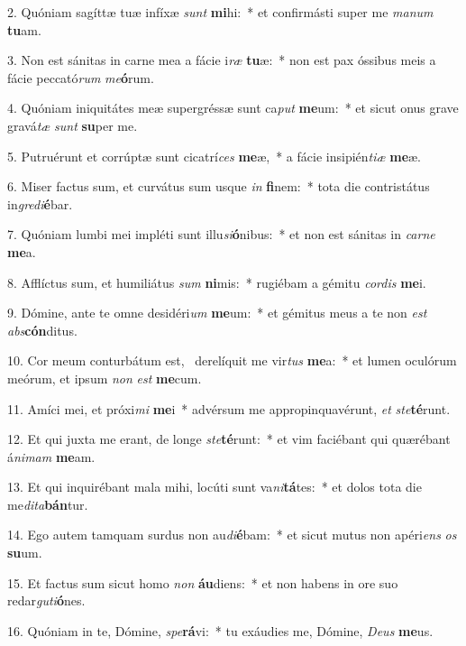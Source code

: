 2. Quóniam sagíttæ tuæ infíxæ \textit{sunt} \textbf{mi}hi:~*  et confirmásti super me \textit{ma}\textit{num} \textbf{tu}am.\

3. Non est sánitas in carne mea a fácie i\textit{ræ} \textbf{tu}æ:~*  non est pax óssibus meis a fácie peccató\textit{rum} \textit{me}\textbf{ó}rum.\

4. Quóniam iniquitátes meæ supergréssæ sunt ca\textit{put} \textbf{me}um:~*  et sicut onus grave gravá\textit{tæ} \textit{sunt} \textbf{su}per me.\

5. Putruérunt et corrúptæ sunt cicatrí\textit{ces} \textbf{me}æ,~*  a fácie insipién\textit{ti}\textit{æ} \textbf{me}æ.\

6. Miser factus sum, et curvátus sum usque \textit{in} \textbf{fi}nem:~*  tota die contristátus in\textit{gre}\textit{di}\textbf{é}bar.\

7. Quóniam lumbi mei impléti sunt illu\textit{si}\textbf{ó}nibus:~*  et non est sánitas in \textit{car}\textit{ne} \textbf{me}a.\

8. Afflíctus sum, et humiliátus \textit{sum} \textbf{ni}mis:~*  rugiébam a gémitu \textit{cor}\textit{dis} \textbf{me}i.\

9. Dómine, ante te omne desidéri\textit{um} \textbf{me}um:~*  et gémitus meus a te non \textit{est} \textit{abs}\textbf{cón}ditus.\

10. Cor meum conturbátum est, \dag\  derelíquit me vir\textit{tus} \textbf{me}a:~*  et lumen oculórum meórum, et ipsum \textit{non} \textit{est} \textbf{me}cum.\

11. Amíci mei, et próxi\textit{mi} \textbf{me}i~*  advérsum me appropinquavérunt, \textit{et} \textit{ste}\textbf{té}runt.\

12. Et qui juxta me erant, de longe \textit{ste}\textbf{té}runt:~*  et vim faciébant qui quærébant á\textit{ni}\textit{mam} \textbf{me}am.\

13. Et qui inquirébant mala mihi, locúti sunt va\textit{ni}\textbf{tá}tes:~*  et dolos tota die me\textit{di}\textit{ta}\textbf{bán}tur.\

14. Ego autem tamquam surdus non au\textit{di}\textbf{é}bam:~*  et sicut mutus non apéri\textit{ens} \textit{os} \textbf{su}um.\

15. Et factus sum sicut homo \textit{non} \textbf{áu}diens:~*  et non habens in ore suo redar\textit{gu}\textit{ti}\textbf{ó}nes.\

16. Quóniam in te, Dómine, \textit{spe}\textbf{rá}vi:~*  tu exáudies me, Dómine, \textit{De}\textit{us} \textbf{me}us.\

